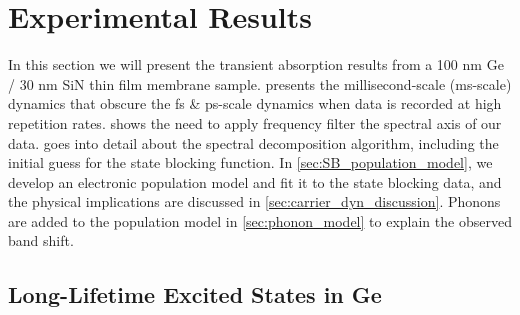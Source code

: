 

%

%


\section{Experimental Results}
\label{sec:experimental_results}

In this section we will present the transient absorption results from a 100 nm Ge / 30 nm SiN thin film membrane sample.  presents the millisecond-scale (ms-scale) dynamics that obscure the fs \& ps-scale dynamics when data is recorded at high repetition rates.  shows the need to apply frequency filter the spectral axis of our data.  goes into detail about the spectral decomposition algorithm, including the initial guess for the state blocking function. In \cref{sec:SB_population_model}, we develop an electronic population model and fit it to the state blocking data, and the physical implications are discussed in \cref{sec:carrier_dyn_discussion}. Phonons are added to the population model in \cref{sec:phonon_model} to explain the observed band shift.

\subsection{Long-Lifetime Excited States in Ge}
\label{sec:ms_dynamics}

